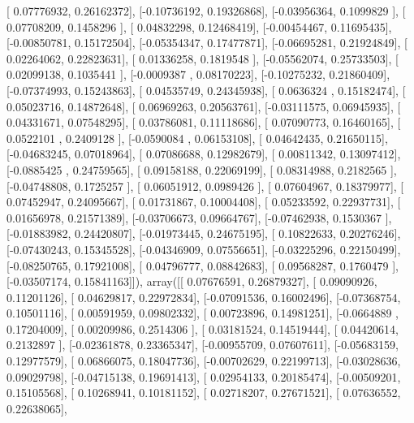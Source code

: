 \documentclass{article}
\begin{document}
       [ 0.07776932,  0.26162372],
       [-0.10736192,  0.19326868],
       [-0.03956364,  0.1099829 ],
       [ 0.07708209,  0.1458296 ],
       [ 0.04832298,  0.12468419],
       [-0.00454467,  0.11695435],
       [-0.00850781,  0.15172504],
       [-0.05354347,  0.17477871],
       [-0.06695281,  0.21924849],
       [ 0.02264062,  0.22823631],
       [ 0.01336258,  0.1819548 ],
       [-0.05562074,  0.25733503],
       [ 0.02099138,  0.1035441 ],
       [-0.0009387 ,  0.08170223],
       [-0.10275232,  0.21860409],
       [-0.07374993,  0.15243863],
       [ 0.04535749,  0.24345938],
       [ 0.0636324 ,  0.15182474],
       [ 0.05023716,  0.14872648],
       [ 0.06969263,  0.20563761],
       [-0.03111575,  0.06945935],
       [ 0.04331671,  0.07548295],
       [ 0.03786081,  0.11118686],
       [ 0.07090773,  0.16460165],
       [ 0.0522101 ,  0.2409128 ],
       [-0.0590084 ,  0.06153108],
       [ 0.04642435,  0.21650115],
       [-0.04683245,  0.07018964],
       [ 0.07086688,  0.12982679],
       [ 0.00811342,  0.13097412],
       [-0.0885425 ,  0.24759565],
       [ 0.09158188,  0.22069199],
       [ 0.08314988,  0.2182565 ],
       [-0.04748808,  0.1725257 ],
       [ 0.06051912,  0.0989426 ],
       [ 0.07604967,  0.18379977],
       [ 0.07452947,  0.24095667],
       [ 0.01731867,  0.10004408],
       [ 0.05233592,  0.22937731],
       [ 0.01656978,  0.21571389],
       [-0.03706673,  0.09664767],
       [-0.07462938,  0.1530367 ],
       [-0.01883982,  0.24420807],
       [-0.01973445,  0.24675195],
       [ 0.10822633,  0.20276246],
       [-0.07430243,  0.15345528],
       [-0.04346909,  0.07556651],
       [-0.03225296,  0.22150499],
       [-0.08250765,  0.17921008],
       [ 0.04796777,  0.08842683],
       [ 0.09568287,  0.1760479 ],
       [-0.03507174,  0.15841163]]), array([[ 0.07676591,  0.26879327],
       [ 0.09090926,  0.11201126],
       [ 0.04629817,  0.22972834],
       [-0.07091536,  0.16002496],
       [-0.07368754,  0.10501116],
       [ 0.00591959,  0.09802332],
       [ 0.00723896,  0.14981251],
       [-0.0664889 ,  0.17204009],
       [ 0.00209986,  0.2514306 ],
       [ 0.03181524,  0.14519444],
       [ 0.04420614,  0.2132897 ],
       [-0.02361878,  0.23365347],
       [-0.00955709,  0.07607611],
       [-0.05683159,  0.12977579],
       [ 0.06866075,  0.18047736],
       [-0.00702629,  0.22199713],
       [-0.03028636,  0.09029798],
       [-0.04715138,  0.19691413],
       [ 0.02954133,  0.20185474],
       [-0.00509201,  0.15105568],
       [ 0.10268941,  0.10181152],
       [ 0.02718207,  0.27671521],
       [ 0.07636552,  0.22638065],
\end{document}
